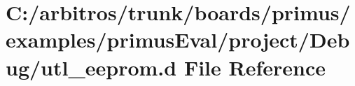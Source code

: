 \hypertarget{boards_2primus_2examples_2primus_eval_2project_2_debug_2utl__eeprom_8d}{\section{C\-:/arbitros/trunk/boards/primus/examples/primus\-Eval/project/\-Debug/utl\-\_\-eeprom.d File Reference}
\label{boards_2primus_2examples_2primus_eval_2project_2_debug_2utl__eeprom_8d}
}
